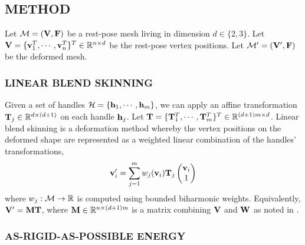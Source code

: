 \subsection*{METHOD}

Let $\mathcal{M} = (\mathbf{V}, \mathbf{F})$ be a rest-pose mesh living in dimension $d\in\{2,3\}$. Let $\mathbf{V} = \{\mathbf{v}_1^T, \cdots, \mathbf{v}_n^T\}^T \in \mathbb{R}^{n \times d}$ be the rest-pose vertex positions. Let $\mathcal{M}' = (\mathbf{V}', \mathbf{F})$ be the deformed mesh.

\subsubsection*{LINEAR BLEND SKINNING}

Given a set of handles $\mathcal{H} = \{ \mathbf{h}_1, \cdots, \mathbf{h}_m \}$, we can apply an affine transformation $\mathbf{T}_j \in \mathbb{R}^{d \times (d+1)}$ on each handle $\mathbf{h}_j$. Let $\mathbf{T} = \{ \mathbf{T}_1^T, \cdots, \mathbf{T}_m^T \}^T \in \mathbb{R}^{(d+1)m \times d}$. Linear blend skinning is a deformation method whereby the vertex positions on the deformed shape are represented as a weighted linear combination of the handles' transformations,
\[
    \mathbf{v}_i' = \sum_{j=1}^m w_j(\mathbf{v}_i) \mathbf{T}_j 
    \begin{pmatrix} 
    \mathbf{v}_i \\
    1 
    \end{pmatrix} 
\]
where $w_j: \mathcal{M} \rightarrow \mathbb{R}$ is computed using bounded biharmonic weights.\cite{jacobson_bounded_biharmonic_weights_2011} Equivalently, $\mathbf{V}' = \mathbf{M} \mathbf{T}$, where $\mathbf{M} \in \mathbb{R}^{n \times (d+1)m}$ is a matrix combining $\mathbf{V}$ and $\mathbf{W}$ as noted in \cite{jacobson_fast_2012}. 





\subsubsection*{AS-RIGID-AS-POSSIBLE ENERGY}

